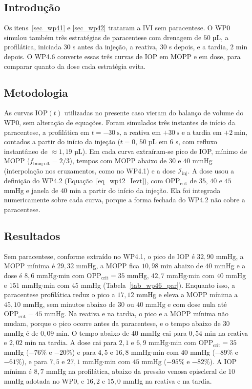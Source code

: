 \subsection{Introdução}

Os itens~\ref{sec_wp41} e \ref{sec_wp42} trataram a IVI sem paracentese. O WP0 simulou também três estratégias de paracentese com drenagem de $50$ µL, a profilática, iniciada $30$ s antes da injeção, a reativa, $30$ s depois, e a tardia, $2$ min depois. O WP4.6 converte essas três curvas de IOP em MOPP e em dose, para comparar quanto da dose cada estratégia evita.

\subsection{Metodologia}

As curvas $\mathrm{IOP}(t)$ utilizadas no presente caso vieram do balanço de volume do WP0, sem alteração de equações. Foram simulados três instantes de início da paracentese, a profilática em $t=-\SI{30}{\second}$, a reativa em $+\SI{30}{\second}$ e a tardia em $+\SI{2}{\minute}$, contados a partir do início da injeção ($t=0$, $50$ µL em $6$ s, com refluxo instantâneo de $\approx1{,}19$ µL). Em cada curva extraíram-se pico de IOP, mínimo de MOPP ($f_{\mathrm{braq\text{-}oft}}=2/3$), tempos com MOPP abaixo de $30$ e $40$ mmHg (interpolação nos cruzamentos, como no WP4.1) e a dose $\mathcal{I}_{\mathrm{inj}}$. A dose usou a definição do WP4.2 (Equação~\ref{eq_wp42_Ievt}), com $\mathrm{OPP}_{\text{crit}}$ de $35$, $40$ e $45$ mmHg e janela de $40$ min a partir do início da injeção. Ela foi integrada numericamente sobre cada curva, porque a forma fechada do WP4.2 não cobre a paracentese.

\subsection{Resultados}

Sem paracentese, conforme extraído no WP4.1, o pico de IOP é $32{,}90$ mmHg, a MOPP mínima é $29{,}32$ mmHg, a MOPP fica $10{,}98$ min abaixo de $40$ mmHg e a dose é $8{,}6$ mmHg$\cdot$min com $\mathrm{OPP}_{\text{crit}}=35$ mmHg, $42{,}7$ mmHg$\cdot$min com $40$ mmHg e $151$ mmHg$\cdot$min com $45$ mmHg (Tabela~\ref{tab_wp46_par}). Enquanto isso, a paracentese profilática reduz o pico a $17{,}12$ mmHg e eleva a MOPP mínima a $45{,}10$ mmHg, sem minutos abaixo de $30$ ou $40$ mmHg e com dose nula até $\mathrm{OPP}_{\text{crit}}=45$ mmHg. Na reativa e na tardia, o pico e a MOPP mínima não mudam, porque o pico ocorre antes da paracentese, e o tempo abaixo de $30$ mmHg é de $0{,}09$ min. O tempo abaixo de $40$ mmHg cai para $0{,}54$ min na reativa e $2{,}02$ min na tardia. A dose cai para $2{,}1$ e $6{,}9$ mmHg$\cdot$min com $\mathrm{OPP}_{\text{crit}}=35$ mmHg ($-76\%$ e $-20\%$) e para $4{,}5$ e $16{,}8$ mmHg$\cdot$min com $40$ mmHg ($-89\%$ e $-61\%$), e para $7{,}5$ e $27{,}1$ mmHg$\cdot$min com $45$ mmHg ($-95\%$ e $-82\%$). A IOP mínima é $8{,}7$ mmHg na profilática, abaixo da pressão venosa episcleral de $10$ mmHg adotada no WP0, e $16{,}2$ e $15{,}0$ mmHg na reativa e na tardia.

